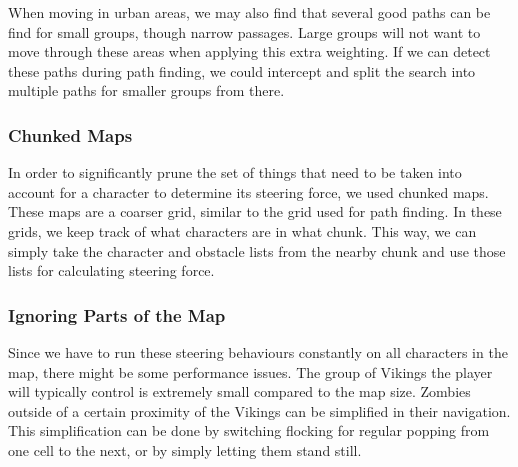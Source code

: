 When moving in urban areas, we may also find that several good paths can be find for small groups, though narrow passages. Large groups will not want to move through these areas when applying this extra weighting. If we can detect these paths during path finding, we could intercept and split the search into multiple paths for smaller groups from there.

\subsubsection{Chunked Maps}
In order to significantly prune the set of things that need to be taken into account for a character to determine its steering force, we used chunked maps. These maps are a coarser grid, similar to the grid used for path finding. In these grids, we keep track of what characters are in what chunk. This way, we can simply take the character and obstacle lists from the nearby chunk and use those lists for calculating steering force.

\subsubsection{Ignoring Parts of the Map}
Since we have to run these steering behaviours constantly on all characters in the map, there might be some performance issues. The group of Vikings the player will typically control is extremely small compared to the map size. Zombies outside of a certain proximity of the Vikings can be simplified in their navigation. This simplification can be done by switching flocking for regular popping from one cell to the next, or by simply letting them stand still.
